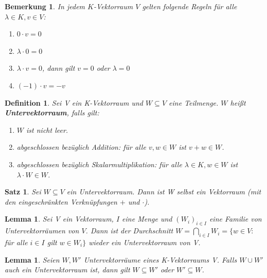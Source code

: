 \documentclass[12pt,a4paper]{article}
\theoremstyle{plain}
\newtheorem{Satz}[Theorem]{Satz}
\newtheorem{Lemma}[Theorem]{Lemma}
\newtheorem{Definition}[Theorem]{Definition}
\newtheorem{Bemerkung}[Theorem]{Bemerkung}
\newcommand{\herv}[1]{{\emph{\textbf{#1}}}}
\numberwithin{equation}{section}
\begin{document}
\begin{Bemerkung}
In jedem $K$-Vektorraum $V$ gelten folgende Regeln für alle $\lambda\in K, v\in V$:
\begin{enumerate}
\renewcommand{\labelenumi}{\alph{enumi})}
\item $0\cdot v=0$
\item $\lambda\cdot 0=0$
\item $\lambda\cdot v=0$, dann gilt $v=0$ oder $\lambda=0$
\item $(-1)\cdot v=-v$
\end{enumerate}
\end{Bemerkung}
\begin{Definition}
Sei V ein K-Vektorraum und $W\subseteq V$ eine Teilmenge. $W$ heißt \herv{Untervektorraum}, falls gilt:
\begin{enumerate}
\renewcommand{\labelenumi}{\emph{\underline{UV\arabic{enumi}}}}
\item $W$ ist nicht leer.
\item abgeschlossen bezüglich Addition: für alle $v,w\in W$ ist $v+w\in W$.
\item abgeschlossen bezüglich Skalarmultiplikation: für alle $\lambda\in K, w\in W$ ist $\lambda \cdot W\in W$.
\end{enumerate}
\end{Definition}
\begin{Satz}
Sei $W\subseteq V$ ein Untervektorraum. Dann ist W selbst ein Vektorraum (mit den eingeschränkten Verknüpfungen $+$ und $\cdot$).
\end{Satz}
\begin{Lemma}
Sei V ein Vektorraum, $I$ eine Menge und $(W_i)_{i\in I}$ eine Familie von Untervektorräumen von $V$. Dann ist der Durchschnitt $W=\bigcap_{i\in I} W_i=\{w\in V:$ für alle $i\in I$ gilt $w\in W_i\}$ wieder ein Untervektorraum von V.
\end{Lemma}
\begin{Lemma}
Seien $W,W'$ Untervektorräume eines K-Vektorraums V. Falls $W\cup W'$ auch ein Untervektorraum ist, dann gilt $W\subseteq W'$ oder $W'\subseteq W$.
\end{Lemma}
\end{document}
